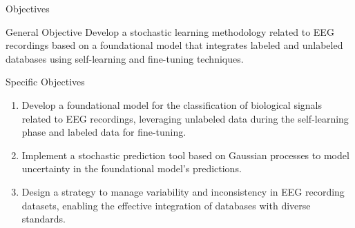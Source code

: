 \documentclass[spanish, aspectratio=169]{beamer}
\begin{document}
\begin{frame}{Objectives}
	\begin{block}{General Objective}
		\small
		Develop a stochastic learning methodology related to EEG recordings based on a foundational model that integrates labeled and unlabeled databases using self-learning and fine-tuning techniques.
	\end{block}
	
	\vspace{-0.1cm}
	\begin{block}{Specific Objectives}
		\small
		\begin{enumerate}
			\item Develop a foundational model for the classification of biological signals related to EEG recordings, leveraging \textcolor{MyAccent}{unlabeled data} during the self-learning phase and labeled data for fine-tuning.
			\item Implement a \textcolor{MyAccent}{stochastic prediction} tool based on Gaussian processes to model uncertainty in the foundational model's predictions.
			\item Design a strategy to \textcolor{MyAccent}{manage variability and inconsistency} in EEG recording datasets, enabling the effective integration of databases with diverse standards.
		\end{enumerate}
	\end{block}
\end{frame}









	


\end{document}
